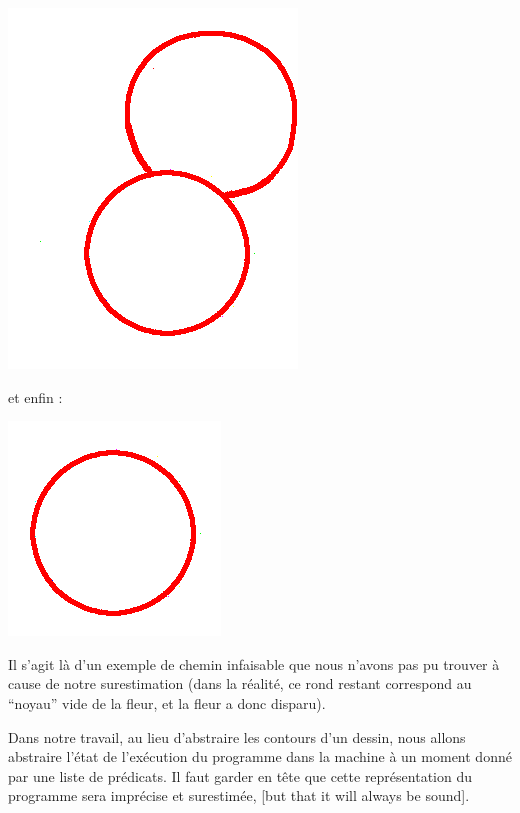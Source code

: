 \documentclass[french]{article}
\begin{document}
  \begin{center}
    \includegraphics[scale=0.19]{./pictures/flower8.png}
  \end{center}
  
  et enfin :

  \begin{center}
    \includegraphics[scale=0.19]{./pictures/flower9.png}
  \end{center}
  
  Il s'agit là d'un exemple de chemin infaisable que nous n'avons pas pu trouver à cause de notre surestimation (dans la réalité, ce rond restant correspond au ``noyau'' vide de la fleur, et la fleur a donc disparu).
  
  \bigbreak
  
  Dans notre travail, au lieu d'abstraire les contours d'un dessin, nous allons abstraire l'état de l'exécution du programme dans la machine à un moment donné par une liste de prédicats. Il faut garder en tête que cette représentation du programme sera imprécise et surestimée, [but that it will always be sound]. %
\end{document}
